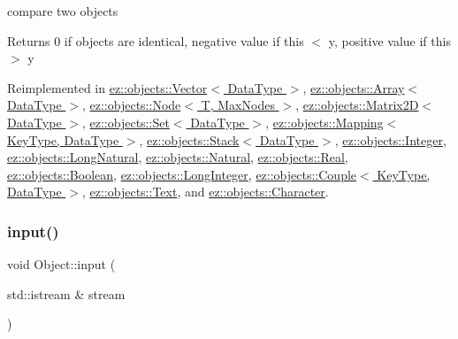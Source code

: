 compare two objects \begin{DoxyReturn}{Returns}
0 if objects are identical, negative value if this $<$ y, positive value if this $>$ y 
\end{DoxyReturn}


Reimplemented in \hyperlink{classez_1_1objects_1_1Vector_af4bd9b005b03d1a9e5ec958d96cc24ee}{ez\+::objects\+::\+Vector$<$ Data\+Type $>$}, \hyperlink{classez_1_1objects_1_1Array_ac0d97a024e177f655b2f58981a68fcf8}{ez\+::objects\+::\+Array$<$ Data\+Type $>$}, \hyperlink{classez_1_1objects_1_1Node_af5a55f4379b2f6be1ba3cf905d124462}{ez\+::objects\+::\+Node$<$ T, Max\+Nodes $>$}, \hyperlink{classez_1_1objects_1_1Matrix2D_ab0b55556ba7c31aa5ad376a91b63d6c3}{ez\+::objects\+::\+Matrix2\+D$<$ Data\+Type $>$}, \hyperlink{classez_1_1objects_1_1Set_aeaab2cadd3a001a94acb40d7cf2b2b00}{ez\+::objects\+::\+Set$<$ Data\+Type $>$}, \hyperlink{classez_1_1objects_1_1Mapping_a7eb092099b5f47b101e5c54a46373ff0}{ez\+::objects\+::\+Mapping$<$ Key\+Type, Data\+Type $>$}, \hyperlink{classez_1_1objects_1_1Stack_a47b43cce6f59f79ffa0b344c109aae35}{ez\+::objects\+::\+Stack$<$ Data\+Type $>$}, \hyperlink{classez_1_1objects_1_1Integer_ab49e5990b97a97b1954dfa9222d29c82}{ez\+::objects\+::\+Integer}, \hyperlink{classez_1_1objects_1_1LongNatural_ad2ed144e5ee01a72eff476141c6e39ae}{ez\+::objects\+::\+Long\+Natural}, \hyperlink{classez_1_1objects_1_1Natural_ad053e5ddc5242e8e94ce5f14ecc4dd13}{ez\+::objects\+::\+Natural}, \hyperlink{classez_1_1objects_1_1Real_ab5876f5ce73db15906113a2651453eca}{ez\+::objects\+::\+Real}, \hyperlink{classez_1_1objects_1_1Boolean_a6ccc996f98fece5fbe6fd6ebcbd39f4a}{ez\+::objects\+::\+Boolean}, \hyperlink{classez_1_1objects_1_1LongInteger_ac2771a597b5f2ed611d9eb10f4339019}{ez\+::objects\+::\+Long\+Integer}, \hyperlink{classez_1_1objects_1_1Couple_a0f4afb11f854f2e84fd2d413cd08212e}{ez\+::objects\+::\+Couple$<$ Key\+Type, Data\+Type $>$}, \hyperlink{classez_1_1objects_1_1Text_a05d5c20a25ced7a9ad33c997f435f226}{ez\+::objects\+::\+Text}, and \hyperlink{classez_1_1objects_1_1Character_a2e6241f13a2f749e7b1951667b4ec96a}{ez\+::objects\+::\+Character}.

\mbox{\label{classez_1_1objects_1_1Object_a878bdc53b7f16fda6fa15dab214c4b6a}} 
\subsubsection{\texorpdfstring{input()}{input()}}
{\footnotesize\ttfamily void Object\+::input (\begin{DoxyParamCaption}\item[{std\+::istream \&}]{stream }\end{DoxyParamCaption})\hspace{0.3cm}{\ttfamily [virtual]}}

